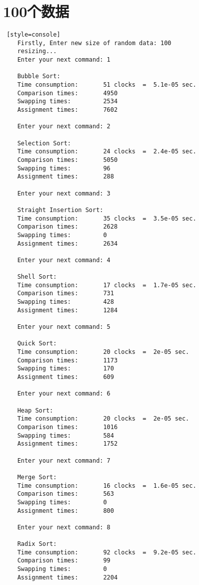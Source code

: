 \section{100个数据}
\begin{lstlisting} [style=console]
    Firstly, Enter new size of random data: 100
    resizing...
    Enter your next command: 1
    
    Bubble Sort:
    Time consumption:		51 clocks  =  5.1e-05 sec.
    Comparison times:		4950
    Swapping times:  		2534
    Assignment times:		7602
    
    Enter your next command: 2
    
    Selection Sort:
    Time consumption:		24 clocks  =  2.4e-05 sec.
    Comparison times:		5050
    Swapping times:  		96
    Assignment times:		288
    
    Enter your next command: 3
    
    Straight Insertion Sort:
    Time consumption:		35 clocks  =  3.5e-05 sec.
    Comparison times:		2628
    Swapping times:  		0
    Assignment times:		2634    
    
    Enter your next command: 4
    
    Shell Sort:
    Time consumption:		17 clocks  =  1.7e-05 sec.
    Comparison times:		731
    Swapping times:  		428
    Assignment times:		1284
    
    Enter your next command: 5
    
    Quick Sort:
    Time consumption:		20 clocks  =  2e-05 sec.
    Comparison times:		1173
    Swapping times:  		170
    Assignment times:		609
    
    Enter your next command: 6
    
    Heap Sort:
    Time consumption:		20 clocks  =  2e-05 sec.
    Comparison times:		1016
    Swapping times:  		584
    Assignment times:		1752
    
    Enter your next command: 7
    
    Merge Sort:
    Time consumption:		16 clocks  =  1.6e-05 sec.
    Comparison times:		563
    Swapping times:  		0
    Assignment times:		800
    
    Enter your next command: 8
    
    Radix Sort:
    Time consumption:		92 clocks  =  9.2e-05 sec.
    Comparison times:		99
    Swapping times:  		0
    Assignment times:		2204
\end{lstlisting}

